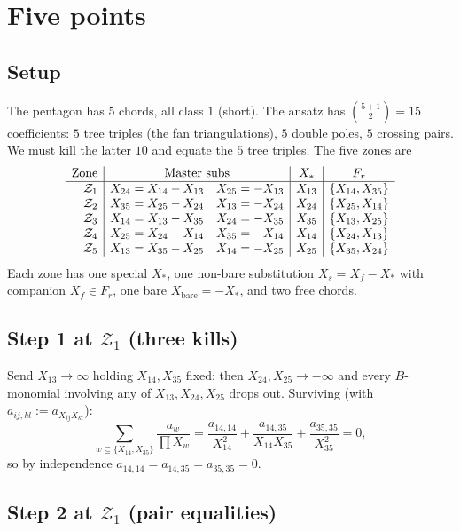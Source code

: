\documentclass[11pt]{article}
\newcommand{\Zr}{\mathcal{Z}}
\newcommand{\Fr}{F}
\begin{document}
\section{Five points}

\subsection{Setup}

The pentagon has $5$ chords, all class $1$ (short).  The ansatz
has $\binom{5+1}{2}=15$ coefficients: $5$ tree triples (the fan
triangulations), $5$ double poles, $5$ crossing pairs.  We must
kill the latter $10$ and equate the $5$ tree triples.  The five
zones are
\[
\begin{array}{r|ll|c|c}
\text{Zone} & \multicolumn{2}{c|}{\text{Master subs}} & X_* & \Fr_r\\\hline
\Zr_1 & X_{24}=X_{14}-X_{13} & X_{25}=-X_{13} & X_{13} & \{X_{14},X_{35}\}\\
\Zr_2 & X_{35}=X_{25}-X_{24} & X_{13}=-X_{24} & X_{24} & \{X_{25},X_{14}\}\\
\Zr_3 & X_{14}=X_{13}-X_{35} & X_{24}=-X_{35} & X_{35} & \{X_{13},X_{25}\}\\
\Zr_4 & X_{25}=X_{24}-X_{14} & X_{35}=-X_{14} & X_{14} & \{X_{24},X_{13}\}\\
\Zr_5 & X_{13}=X_{35}-X_{25} & X_{14}=-X_{25} & X_{25} & \{X_{35},X_{24}\}\\
\end{array}
\]
Each zone has one special $X_*$, one non-bare substitution $X_s = X_f - X_*$
with companion $X_f\in\Fr_r$, one bare $X_{\text{bare}}=-X_*$, and two free chords.

\subsection{Step 1 at $\Zr_1$ (three kills)}

Send $X_{13}\to\infty$ holding $X_{14},X_{35}$ fixed: then
$X_{24},X_{25}\to-\infty$ and every $B$-monomial involving any of
$X_{13},X_{24},X_{25}$ drops out.  Surviving (with $a_{ij,kl} := a_{X_{ij}X_{kl}}$):
\[
\sum_{w\subseteq\{X_{14},X_{35}\}} \frac{a_w}{\prod X_w}
= \frac{a_{14,14}}{X_{14}^2} + \frac{a_{14,35}}{X_{14}X_{35}} + \frac{a_{35,35}}{X_{35}^2}=0,
\]
so by independence $a_{14,14}=a_{14,35}=a_{35,35}=0$.

\subsection{Step 2 at $\Zr_1$ (pair equalities)}
\end{document}
